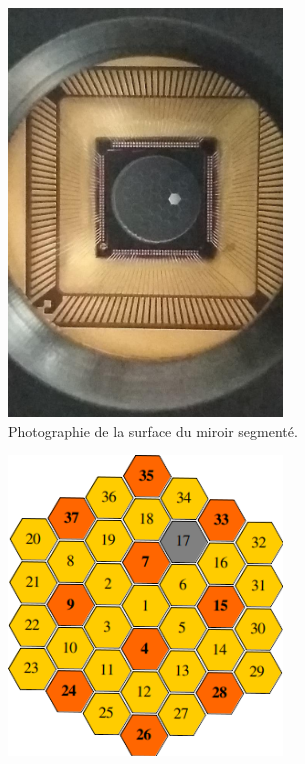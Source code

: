 \begin{figure}[ht!]
    \centering
    \begin{subfigure}[t]{0.4\textwidth}
        \centering
        \includegraphics[width=0.8\textwidth]{Figure_Chap2/20191114_BrokenSegment_02.jpg}
        \caption{Photographie de la surface du miroir segmenté.}
        \label{fig:IrisAOMapA}
    \end{subfigure}%
    \begin{subfigure}[t]{0.5\textwidth}
        \centering
        \includegraphics[width=0.8\textwidth]{Figure_Chap2/MemsMap_AllFibers.png}

\end{subfigure}
\end{figure}

